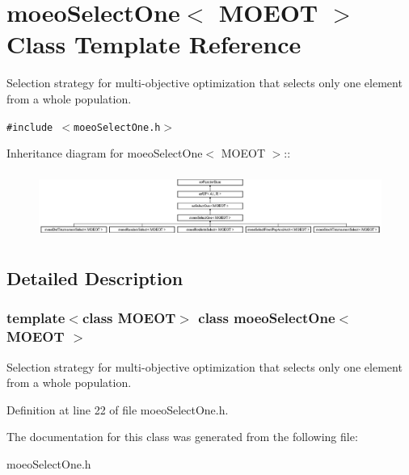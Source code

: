 \section{moeo\-Select\-One$<$ MOEOT $>$ Class Template Reference}
\label{classmoeoSelectOne}
Selection strategy for multi-objective optimization that selects only one element from a whole population.  


{\tt \#include $<$moeo\-Select\-One.h$>$}

Inheritance diagram for moeo\-Select\-One$<$ MOEOT $>$::\begin{figure}[H]
\begin{center}
\leavevmode
\includegraphics[height=2.17899cm]{classmoeoSelectOne}
\end{center}
\end{figure}


\subsection{Detailed Description}
\subsubsection*{template$<$class MOEOT$>$ class moeo\-Select\-One$<$ MOEOT $>$}

Selection strategy for multi-objective optimization that selects only one element from a whole population. 



Definition at line 22 of file moeo\-Select\-One.h.

The documentation for this class was generated from the following file:\begin{CompactItemize}
\item 
moeo\-Select\-One.h\end{CompactItemize}
